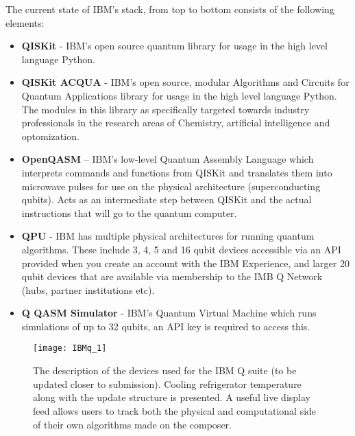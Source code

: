 The current state of IBM's stack, from top to bottom consists of the following elements:

\begin{itemize}
    \item \textbf{QISKit} - IBM's open source quantum library for usage in the high level language Python. 
    \item \textbf{QISKit ACQUA} - IBM's open source, modular Algorithms and Circuits for Quantum Applications library for usage in the high level language Python. The modules in this library as specifically targeted towards industry professionals in the research areas of Chemistry, artificial intelligence and optomization. 
    \item \textbf{OpenQASM} – IBM's low-level Quantum Assembly Language which interprets commands and functions from QISKit and translates them into microwave pulses for use on the physical architecture (superconducting qubits). Acts as an intermediate step between QISKit and the actual instructions that will go to the quantum computer.
    \item \textbf{QPU} - IBM has multiple physical architectures for running quantum algorithms. These include 3, 4, 5 and 16 qubit devices accessible via an API provided when you create an account with the IBM Experience, and larger 20 qubit devices that are available via membership to the IMB Q Network (hubs, partner institutions etc).
    \item \textbf{Q QASM Simulator} - IBM's Quantum Virtual Machine which runs simulations of up to 32 qubits, an API key is required to access this.
\end{itemize}
\begin{figure}[h!]
\centering
\texttt{[image: IBMq\_1]}
\caption{The description of the devices used for the IBM Q suite (to be updated closer to submission). Cooling refrigerator temperature along with the update structure is presented. A useful live display feed allows users to track both the physical and computational side of their own algorithms made on the composer.}
\label{fig:ibmsite}
\end{figure}


